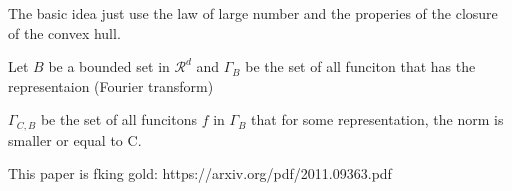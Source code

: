 The basic idea just use the law of large number and the properies of the closure of the convex hull.

Let $B$ be a bounded set in $\mathcal{R}^d$ and $\Gamma_B$ be the set
of all funciton that has the representaion (Fourier transform)

$\Gamma_{C, B}$ be the set of all funcitons $f$ in $\Gamma_B$ that for some 
representation, the norm is smaller or equal to C.

This paper is fking gold: https://arxiv.org/pdf/2011.09363.pdf


